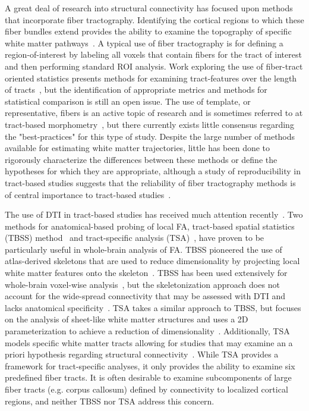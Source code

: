 A great deal of research into structural connectivity has focused upon methods that incorporate fiber tractography. Identifying the cortical regions to which these fiber bundles extend provides the ability to examine the topography of specific white matter pathways~\cite{Behrens2003}. A typical use of fiber tractography is for defining a region-of-interest by labeling all voxels that contain fibers for the tract of interest and then performing standard ROI analysis. Work exploring the use of fiber-tract oriented statistics presents methods for examining tract-features over the length of tracts~\cite{Jones2005,Corouge2006,Maddah2008d,Lin2006,ODonnell2009,Davis2009,Goodlett2009a,Batchelor2006}, but the identification of appropriate metrics and methods for statistical comparison is still an open issue. The use of template, or representative, fibers is an active topic of research and is sometimes referred to at tract-based morphometry~\cite{O'Donnell2009}, but there currently exists little consensus regarding the "best-practices" for this type of study. Despite the large number of methods available for estimating white matter trajectories, little has been done to rigorously characterize the differences between these methods or define the hypotheses for which they are appropriate, although a study of reproducibility in tract-based studies suggests that the reliability of fiber tractography methods is of central importance to tract-based studies~\cite{Ciccarelli2003}. 

The use of DTI in tract-based studies has received much attention recently~\cite{Corouge2006,Ding2003,Jones2005,Fillard2003}. Two methods for anatomical-based probing of local FA, tract-based spatial statistics (TBSS) method~\cite{Smith2006} and tract-specific analysis (TSA)~\cite{Yushkevich2008}, have proven to be particularly useful in whole-brain analysis of FA. TBSS pioneered the use of atlas-derived skeletons that are used to reduce dimensionality by projecting local white matter features onto the skeleton~\cite{Smith2006}. TBSS has been used extensively for whole-brain voxel-wise analysis~\cite{Kochunov2007,Smith2007,Anjari2007,Simonyan2008,Salat2010}, but the skeletonization approach does not account for the wide-spread connectivity that may be assessed with DTI and lacks anatomical specificity~\cite{Zhang2010}. TSA takes a similar approach to TBSS, but focuses on the analysis of sheet-like white matter structures and uses a 2D parameterization to achieve a reduction of dimensionality~\cite{Yushkevich2008}. Additionally, TSA models specific white matter tracts allowing for studies that may examine an a priori hypothesis regarding structural connectivity~\cite{Zhang2010}. While TSA provides a framework for tract-specific analyses, it only provides the ability to examine six predefined fiber tracts. It is often desirable to examine subcomponents of large fiber tracts (e.g. corpus callosum) defined by connectivity to localized cortical regions, and neither TBSS nor TSA address this concern.

